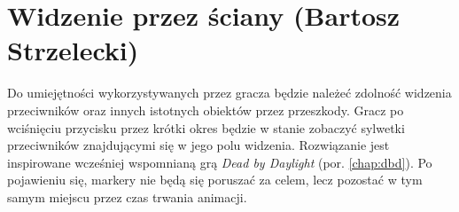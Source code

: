 \section{Widzenie przez ściany (Bartosz Strzelecki)}\label{s:wid_proj}

Do umiejętności wykorzystywanych przez gracza będzie należeć zdolność widzenia przeciwników oraz innych istotnych obiektów przez przeszkody.
Gracz po wciśnięciu przycisku przez krótki okres będzie w stanie zobaczyć sylwetki przeciwników znajdującymi się w jego polu widzenia.
Rozwiązanie jest inspirowane wcześniej wspomnianą grą \textit{Dead by Daylight} (por. \ref{chap:dbd}). Po pojawieniu się,
markery nie będą się poruszać za celem, lecz pozostać w tym samym miejscu przez czas trwania animacji.


